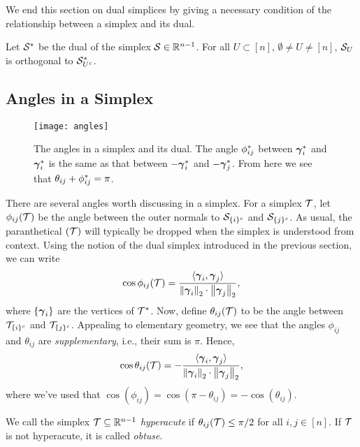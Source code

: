 We end  this section  on dual simplices by giving a necessary condition of the relationship between a simplex and its dual. 

\begin{lemma}
	\label{lem:dual_faces_orthogonal}
	Let $\mathcal{S}^*$ be the dual of the simplex $\mathcal{S}\in\mathbb{R}^{n-1}$. For all $U\subset[n]$, $\emptyset\neq U\neq[n]$, $\mathcal{S}_U$ is orthogonal to $\mathcal{S}_{U^c}^*$.  
\end{lemma}

\subsection{Angles in a Simplex}
\label{sec:background_simplex_angles}

\begin{figure}
	\centering
	\texttt{[image: angles]}
	\caption{The angles in a simplex and its dual. The angle $\phi^*_{ij}$ between $\vb*{\gamma}^*_i$ and $\vb*{\gamma}^*_i$ is the same as that between $-\vb*{\gamma}_i^*$ and $-\vb*{\gamma}_j^*$. From here  we  see that $\theta_{ij}+\phi^*_{ij}=\pi$.}
\end{figure}
There are several angles worth discussing in a simplex. For a simplex $\mathcal{T}$, let $\phi_{ij}(\mathcal{T})$ be the angle between the outer normals to $\mathcal{S}_{\{i\}^c}$ and $\mathcal{S}_{\{j\}^c}$. As usual, the paranthetical $(\mathcal{T})$ will typically be dropped when the simplex is understood from context. Using the notion of the dual simplex introduced in the previous section, we can write 
 \begin{equation*}
\cos \phi_{ij}(\mathcal{T}) = \frac{\langle \vb*{\gamma}_i,\vb*{\gamma}_j\rangle }{\norm{\vb*{\gamma}_i}_2 \cdot \norm{\vb*{\gamma}_j}_2},
\end{equation*}
where $\{\vb*{\gamma}_i\}$ are the vertices of $\mathcal{T}^*$. 
Now, define $\theta_{ij}(\mathcal{T})$ to be the angle between $\mathcal{T}_{\{i\}^c}$ and $\mathcal{T}_{\{j\}^c}$. Appealing to elementary geometry, we see that the angles $\phi_{ij}$ and $\theta_{ij}$ are \emph{supplementary}, i.e., their sum is $\pi$. Hence, 
\begin{equation}
\label{eq:cos_theta_ij}
\cos \theta_{ij}(\mathcal{T}) = - \frac{\langle \vb*{\gamma}_i,\vb*{\gamma}_j\rangle }{\norm{\vb*{\gamma}_i}_2 \cdot \norm{\vb*{\gamma}_j}_2},
\end{equation}
where we've used that $\cos(\phi_{ij}) = \cos(\pi - \theta_{ij}) = -\cos(\theta_{ij})$. 

\begin{definition}
	\label{def:hyperacute}
	We call the simplex $\mathcal{T}\subseteq \mathbb{R}^{n-1}$ \emph{hyperacute} if $\theta_{ij}(\mathcal{T})\leq \pi/2$ for all $i,j\in[n]$. If $\mathcal{T}$ is not hyperacute, it is called \emph{obtuse}. 
\end{definition}


